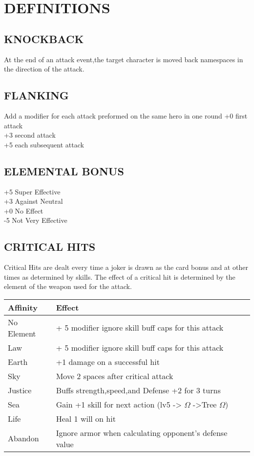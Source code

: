 \chapter{DEFINITIONS}

\section{KNOCKBACK}
At the end of an attack event,the target character is moved back namespaces in the direction of the attack.

\section{FLANKING}
Add a modifier for each attack preformed on the same hero in one round
+0 first attack\\
+3 second attack\\
+5 each subsequent attack\\

\section{ELEMENTAL BONUS}
+5 Super Effective\\
+3 Against Neutral\\
+0 No Effect\\
-5 Not Very Effective

\section{CRITICAL HITS}
Critical Hits are dealt every time a joker is drawn as the card bonus and at other times as determined by skills.  The effect of a critical hit is determined by the element of the weapon used for the attack.\\
\begin{center}
\begin{tabularx}{\textwidth}{X X}
\hline
Affinity & Effect \\
\hline
No Element & + 5 modifier ignore skill buff caps for this attack \\
Law        & + 5 modifier ignore skill buff caps for this attack \\
Earth      & +1 damage on a successful hit \\
Sky        & Move 2 spaces after critical attack\\
Justice    & Buffs strength,speed,and Defense +2 for 3 turns\\
Sea        & Gain +1 skill for next action (lv5 -> $\Omega$ ->Tree $\Omega$) \\
Life & Heal 1 will on hit \\
Abandon & Ignore armor when calculating opponent's defense value\\
\hline
\end{tabularx}
\end{center}

